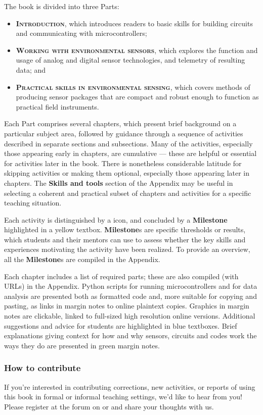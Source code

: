 The book is divided into three Parts:
\begin{itemize}
	\item \textsc{\textbf{Introduction}}, which introduces readers to basic skills for building circuits and communicating with microcontrollers;
	\item \textsc{\textbf{Working with environmental sensors}}, which explores the function and usage of analog and digital sensor technologies, and telemetry of resulting data; and
	\item \textsc{\textbf{Practical skills in environmental sensing}}, which covers methods of producing sensor packages that are compact and robust enough to function as practical field instruments.
\end{itemize}
Each Part comprises several chapters, which present brief background on a particular subject area, followed by guidance through a sequence of activities described in separate sections and subsections. 
Many of the activities, especially those appearing early in chapters, are cumulative --- these are helpful or essential for activities later in the book.
There is nonetheless considerable latitude for skipping activities or making them optional, especially those appearing later in chapters.
The \textbf{Skills and tools} section of the Appendix may be useful in selecting a coherent and practical subset of chapters and activities for a specific teaching situation.

Each activity is distinguished by a \howto icon, and concluded by a \textbf{Milestone} highlighted in a yellow textbox. 
\textbf{Milestone}s are specific thresholds or results, which students and their mentors can use to assess whether the key skills and experiences motivating the activity have been realized. 
To provide an overview, all the \textbf{Milestone}s are compiled in the Appendix.

Each chapter includes a list of required parts; these are also compiled (with URLs) in the Appendix.
Python scripts for running microcontrollers and for data analysis are presented both as formatted code and, more suitable for copying and pasting, as links in margin notes to online plaintext copies.
Graphics in margin notes are clickable, linked to full-sized high resolution online versions.
Additional suggestions and advice for students are highlighted in blue textboxes.
Brief explanations giving context for how and why sensors, circuits and codes work the ways they do are presented in green margin notes.

\subsubsection{How to contribute}
If you're interested in contributing corrections, new activities, or reports of using this book in formal or informal teaching settings, we'd like to hear from you! 
Please register at the forum on  or  and share your thoughts with us.

